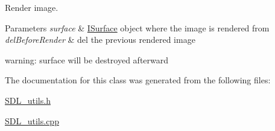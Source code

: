 Render image. 


\begin{DoxyParams}{Parameters}
{\em surface} & \mbox{\hyperlink{class_i_surface}{I\+Surface}} object where the image is rendered from \\
\hline
{\em del\+Before\+Render} & del the previous rendered image\\
\hline
\end{DoxyParams}
warning\+: surface will be destroyed afterward 

The documentation for this class was generated from the following files\+:\begin{DoxyCompactItemize}
\item 
\mbox{\hyperlink{_s_d_l__utils_8h}{S\+D\+L\+\_\+utils.\+h}}\item 
\mbox{\hyperlink{_s_d_l__utils_8cpp}{S\+D\+L\+\_\+utils.\+cpp}}\end{DoxyCompactItemize}

